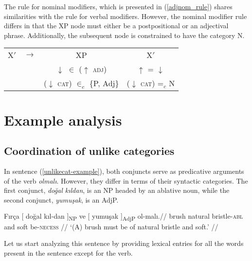 The rule for nominal modifiers, which is presented in (\ref{adjnom_rule}) shares similarities with the rule for verbal modifiers. However, the nominal modifier rule differs in that the XP node must either be a postpositional or an adjectival phrase. Additionally, the subsequent node is constrained to have the category N.

\pex
\vspace{-13pt}

\label{adjnom_rule}
\begin{tabular}{lccc}
	X$'$ & $\longrightarrow$ & XP & X$'$ \\
	& & $\downarrow$ $\in$ ($\uparrow$ \textsc{adj}) & $\uparrow$ = $\downarrow$ \\
	&			   & ($\downarrow$ \textsc{cat}) $\in_{c}$ \{P, Adj\} & ($\downarrow$ \textsc{cat}) =$_{c}$ N  
\end{tabular}
\xe

\section{Example analysis} \label{sec:exampleanalysis}

\subsection{Coordination of unlike categories}

In sentence (\ref{unlikecat-example}), both conjuncts serve as predicative arguments of the verb \textit{olmalı}. However, they differ in terms of their syntactic categories. The first conjunct, \textit{doğal kıldan}, is an NP headed by an ablative noun, while the second conjunct, \textit{yumuşak}, is an AdjP.

\pex[glspace=!1em,everygla={},everyglb={},aboveglbskip=-.15ex, interpartskip=15pt]
\label{unlikecat-example} 
\begingl
\gla Fırça {[} doğal {kıl-dan ]\textsubscript{NP}} ve {[} {yumuşak ]\textsubscript{AdjP}} ol-malı.//
\glb brush natural bristle-\textsc{abl} and soft be-\textsc{necess} //
\glft `(A) brush must be of natural bristle and soft.' //
\endgl
\xe

Let us start analyzing this sentence by providing lexical entries for all the words present in the sentence except for the verb.

\pex

\vspace{-11pt}

